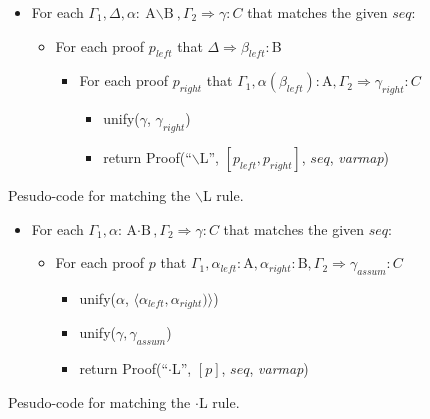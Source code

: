 \documentclass[11pt]{article}
\begin{document}
\begin{figure}
\noindent
\begin{boxedminipage}{\textwidth}
\begin{itemize}
  \item For each $\Gamma_1, \Delta, \alpha:\textrm{A$\backslash$B}, \Gamma_2 \Rightarrow \gamma:C$ that matches the
  given $seq$:
  \begin{itemize}
    \item For each proof $p_{left}$ that $\Delta \Rightarrow \beta_{left}:$B
    \begin{itemize}
      \item For each proof $p_{right}$ that 
            $\Gamma_1, \alpha(\beta_{left}):\textrm{A}, \Gamma_2 \Rightarrow \gamma_{right}:C$
      \begin{itemize}
        \item unify($\gamma$, $\gamma_{right}$)
        \item return Proof(``$\backslash$L'', 
              $\left[p_{left}, p_{right}\right]$, 
              $seq$, \textit{varmap})
      \end{itemize}
    \end{itemize}
  \end{itemize}
\end{itemize}
\vspace{2mm}
\end{boxedminipage}
\caption{Pesudo-code for matching the $\backslash$L rule.}
\label{fig:lslash_l}
\end{figure}

\begin{figure}
\noindent
\begin{boxedminipage}{\textwidth}
\begin{itemize}
  \item For each $\Gamma_1, \alpha:\textrm{A$\cdot$B}, \Gamma_2 \Rightarrow \gamma:C$ 
        that matches the given $seq$:
  \begin{itemize}
    \item For each proof $p$ that 
          $\Gamma_1, \alpha_{left}:\textrm{A}, \alpha_{right}:\textrm{B}, \Gamma_2 \Rightarrow \gamma_{assum}:C$
    \begin{itemize}
      \item unify($\alpha$, $\langle\alpha_{left}, \alpha_{right})\rangle$)
      \item unify($\gamma, \gamma_{assum}$)
      \item return Proof(``$\cdot$L'', $[p]$, $seq$, \textit{varmap})
    \end{itemize}
  \end{itemize}
\end{itemize}
\vspace{2mm}
\end{boxedminipage}
\caption{Pesudo-code for matching the $\cdot$L rule.}
\label{fig:dot_l}
\end{figure}
\end{document}

